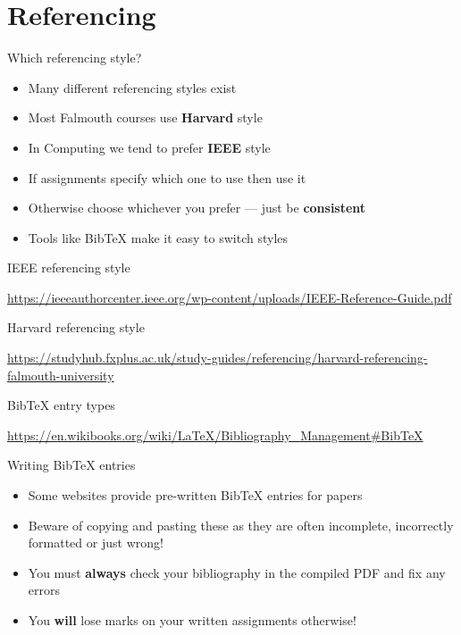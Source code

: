 \part{Referencing}
\frame{\partpage}

\begin{frame}{Which referencing style?}
	\begin{itemize}
		\pause\item Many different referencing styles exist
		\pause\item Most Falmouth courses use \textbf{Harvard} style
		\pause\item In Computing we tend to prefer \textbf{IEEE} style
		\pause\item If assignments specify which one to use then use it
		\pause\item Otherwise choose whichever you prefer --- just be \textbf{consistent}
		\pause\item Tools like BibTeX make it easy to switch styles
	\end{itemize}
\end{frame}

\begin{frame}{IEEE referencing style}
	\begin{center}
		\small\url{https://ieeeauthorcenter.ieee.org/wp-content/uploads/IEEE-Reference-Guide.pdf}
	\end{center}
\end{frame}

\begin{frame}{Harvard referencing style}
	\begin{center}
		\small\url{https://studyhub.fxplus.ac.uk/study-guides/referencing/harvard-referencing-falmouth-university}
	\end{center}
\end{frame}

\begin{frame}{BibTeX entry types}
	\begin{center}
		\small\url{https://en.wikibooks.org/wiki/LaTeX/Bibliography_Management\#BibTeX}
	\end{center}
\end{frame}

\begin{frame}{Writing BibTeX entries}
	\begin{itemize}
		\pause\item Some websites provide pre-written BibTeX entries for papers
		\pause\item Beware of copying and pasting these as they are often incomplete, incorrectly formatted or just wrong!
		\pause\item You must \textbf{always} check your bibliography in the compiled PDF and fix any errors
		\pause\item You \textbf{will} lose marks on your written assignments otherwise!
	\end{itemize}
\end{frame}

